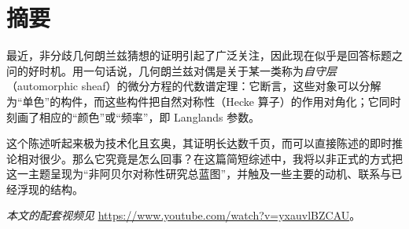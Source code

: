 \documentclass[11pt,a4paper,fontset=windows,UTF8]{ctexart}
\begin{document}
\clearpage

\section*{摘要}

最近，非分歧几何朗兰兹猜想的证明引起了广泛关注，因此现在似乎是回答标题之问的好时机。用一句话说，几何朗兰兹对偶是关于某一类称为\emph{自守层}（automorphic sheaf）的微分方程的代数谱定理：它断言，这些对象可以分解为“单色”的构件，而这些构件把自然对称性（Hecke 算子）的作用对角化；它同时刻画了相应的“颜色”或“频率”，即 Langlands 参数。

这个陈述听起来极为技术化且玄奥，其证明长达数千页，而可以直接陈述的即时推论相对很少。那么它究竟是怎么回事？在这篇简短综述中，我将以非正式的方式把这一主题呈现为“非阿贝尔对称性研究总蓝图”，并触及一些主要的动机、联系与已经浮现的结构。

\medskip
\noindent\textit{本文的配套视频见} \url{https://www.youtube.com/watch?v=yxauvlBZCAU}。

\clearpage
\tableofcontents
\clearpage











\end{document}
